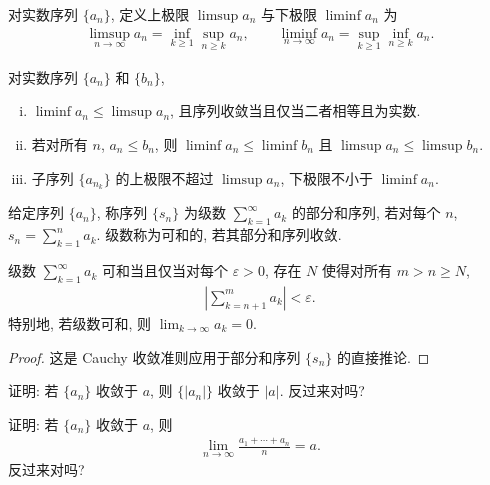 \documentclass[../../main.tex]{subfiles}
\begin{document}
\begin{definition}[上极限与下极限]\label{definition:ch01-limsup}
对实数序列 $\{a_{n}\}$, 定义上极限 $\limsup a_{n}$ 与下极限 $\liminf a_{n}$ 为
\begin{align*}
\limsup_{n\to\infty}a_{n}=\inf_{k\geqslant 1}\sup_{n\geqslant k}a_{n},\qquad\liminf_{n\to\infty}a_{n}=\sup_{k\geqslant 1}\inf_{n\geqslant k}a_{n}.
\end{align*}
\end{definition}

\begin{proposition}\label{proposition:ch01-limsup性质}
对实数序列 $\{a_{n}\}$ 和 $\{b_{n}\}$,
\begin{enumerate}[(i)]
\item $\liminf a_{n}\leqslant\limsup a_{n}$, 且序列收敛当且仅当二者相等且为实数.
\item 若对所有 $n$, $a_{n}\leqslant b_{n}$, 则 $\liminf a_{n}\leqslant\liminf b_{n}$ 且 $\limsup a_{n}\leqslant\limsup b_{n}$.
\item 子序列 $\{a_{n_{k}}\}$ 的上极限不超过 $\limsup a_{n}$, 下极限不小于 $\liminf a_{n}$.
\end{enumerate}
\end{proposition}

给定序列 $\{a_{n}\}$, 称序列 $\{s_{n}\}$ 为级数 $\sum_{k=1}^{\infty}a_{k}$ 的部分和序列, 若对每个 $n$, $s_{n}=\sum_{k=1}^{n}a_{k}$. 级数称为可和的, 若其部分和序列收敛.

\begin{proposition}\label{proposition:ch01-级数收敛}
级数 $\sum_{k=1}^{\infty}a_{k}$ 可和当且仅当对每个 $\varepsilon>0$, 存在 $N$ 使得对所有 $m>n\geqslant N$,
\begin{align*}
\left|\sum_{k=n+1}^{m}a_{k}\right|<\varepsilon.
\end{align*}
特别地, 若级数可和, 则 $\lim_{k\to\infty}a_{k}=0$.
\end{proposition}

\begin{proof}
这是 Cauchy 收敛准则应用于部分和序列 $\{s_{n}\}$ 的直接推论.
\end{proof}

\begin{exercise}\label{exercise:ch01-38}
证明: 若 $\{a_{n}\}$ 收敛于 $a$, 则 $\{|a_{n}|\}$ 收敛于 $|a|$. 反过来对吗?
\end{exercise}

\begin{exercise}\label{exercise:ch01-39}
证明: 若 $\{a_{n}\}$ 收敛于 $a$, 则
\begin{align*}
\lim_{n\to\infty}\frac{a_{1}+\cdots+a_{n}}{n}=a.
\end{align*}
反过来对吗?
\end{exercise}
\end{document}
